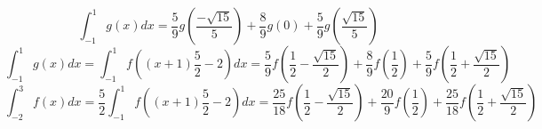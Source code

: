\documentclass[a4paper]{article}
\begin{document}
$$\int_{-1}^1 g(x) dx = \frac{5}{9}g(\frac{-\sqrt{15}}{5}) + \frac{8}{9}g(0) + \frac{5}{9}g(\frac{\sqrt{15}}{5}) $$
$$\int_{-1}^1 g(x) dx = \int_{-1}^1 f((x+1)\frac{5}{2}-2) dx = \frac{5}{9}f(\frac{1}{2}-\frac{\sqrt{15}}{2}) + \frac{8}{9}f(\frac{1}{2}) + \frac{5}{9}f(\frac{1}{2}+\frac{\sqrt{15}}{2}) $$
$$\int_{-2}^3 f(x) dx = \frac{5}{2}\int_{-1}^1 f((x+1)\frac{5}{2}-2) dx = \frac{25}{18}f(\frac{1}{2}-\frac{\sqrt{15}}{2}) + \frac{20}{9}f(\frac{1}{2}) + \frac{25}{18}f(\frac{1}{2}+\frac{\sqrt{15}}{2}) $$
\end{document}
